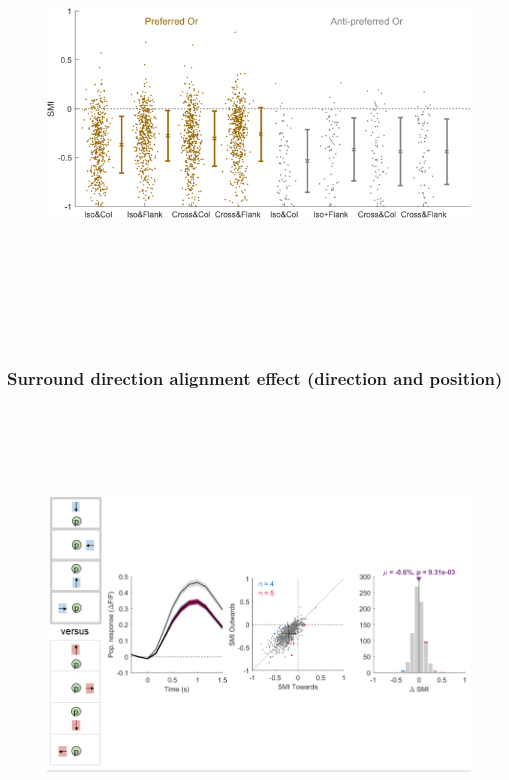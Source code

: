 \begin{figure}[H] \centering \includegraphics[width=12cm,height=12cm,keepaspectratio]{Figures/7.Results/finalPopulation/sel/popPlots_VisROIs_COS_2SalignmentAngle.png} 
\end{figure}

\subsubsection{Surround direction alignment effect (direction and position)}

\begin{figure}[H] \centering \includegraphics[width=12cm,height=12cm,keepaspectratio]{Figures/7.Results/finalPopulation/sel/diagrams/16.png} 
\end{figure}

